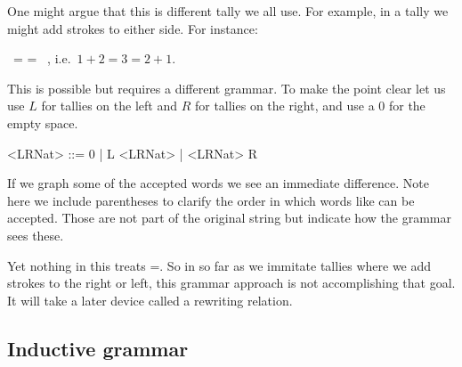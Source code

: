 One might argue that this is different tally we all use.  For example, in a tally we might 
add strokes to either side.  For instance:
\begin{center}
    \StrokeOne~\StrokeTwo = \StrokeThree = \StrokeTwo~\StrokeOne,
    i.e.\ $1+2=3=2+1$.
\end{center}
This is possible but requires a different grammar.  To make the point clear let us 
use $L$ for tallies on the left and $R$ for tallies on the right, and use a $0$ for 
the empty space.
\begin{center}
\begin{gcode}[]
<LRNat> ::= 0
         | L <LRNat>
         | <LRNat> R
\end{gcode}
\end{center}
If we graph some of the accepted words we see an immediate difference.
Note here we include parentheses to clarify the order in which 
words like  can be accepted.  Those are not part of the 
original string but indicate how the grammar sees these.
\begin{center}
\end{center}
Yet nothing in this treats =.  So in so far as we immitate 
tallies where we add strokes to the right or left, this grammar 
approach is not accomplishing that goal.  It will take a later 
device called a rewriting relation.

\subsection{Inductive grammar}

